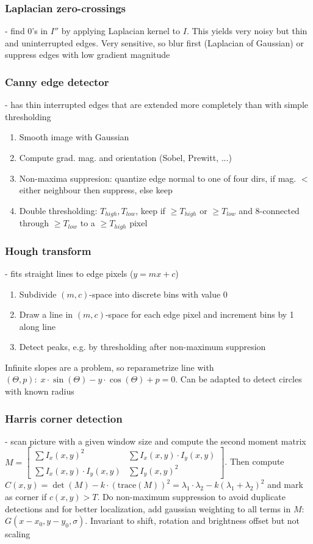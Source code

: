 \documentclass[a4paper,10pt]{article}
\begin{document}
\subsubsection{Laplacian zero-crossings} - find 0's in \( I'' \) by applying Laplacian kernel to \( I \). This yields very noisy but thin and uninterrupted edges. Very sensitive, so blur first (Laplacian of Gaussian) or suppress edges with low gradient magnitude
\subsubsection{Canny edge detector} -
    has thin interrupted edges that are extended more completely than with simple thresholding
    \begin{enumerate}
	\item Smooth image with Gaussian
	\item Compute grad. mag. and orientation (Sobel, Prewitt, ...)
	\item Non-maxima suppresion: quantize edge normal to one of four dirs, if mag. \( <\) either neighbour then suppress, else keep
	\item Double thresholding: \( T_{high}, T_{low} \), keep if \( \ge T_{high} \) or \( \ge T_{low} \) and 8-connected through \( \ge T_{low} \) to a \( \ge T_{high} \) pixel
    \end{enumerate}
\subsubsection{Hough transform} - fits straight lines to edge pixels (\( y = mx + c \))
    \begin{enumerate}
	\item Subdivide \( (m, c) \)-space into discrete bins with value 0
	\item Draw a line in \( (m,c) \)-space for each edge pixel and increment bins by 1 along line
	\item Detect peaks, e.g. by thresholding after non-maximum suppresion
    \end{enumerate}
    Infinite slopes are a problem, so reparametrize line with \( (\Theta , p): \; x \cdot \sin (\Theta )- y \cdot \cos (\Theta ) + p = 0 \). Can be adapted to detect circles with known radius
\subsubsection{Harris corner detection} - scan picture with a given window size and compute the second moment matrix \( M = \left[\begin{smallmatrix}\sum I_x(x,y)^2 & \sum I_x(x,y)\cdot I_y(x,y) \\ \sum I_x(x,y)\cdot I_y(x,y) & \sum I_y(x,y)^2 \end{smallmatrix}\right] \). Then compute \( C(x,y) = \det(M) - k\cdot (\text{trace}(M))^2 = \lambda_1 \cdot \lambda_2 - k(\lambda_1 + \lambda_2)^2 \) and mark as corner if \( c(x,y) > T \). Do non-maximum suppression to avoid duplicate detections and for better localization, add gaussian weighting to all terms in \( M \): \( G(x-x_0, y-y_0, \sigma) \). Invariant to shift, rotation and brightness offset but not scaling
\end{document}
